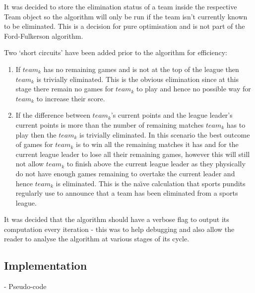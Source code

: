 It was decided to store the elimination status of a team inside the
respective Team object so the algorithm will only be run if the team isn't
currently known to be eliminated. This is a decision for pure optimisation and 
is not part of the Ford-Fulkerson algorithm.

Two `short circuits' have been added prior to the algorithm for efficiency:
\begin{enumerate}
\item If $team_k$ has no remaining games and is not at the top of the league
then $team_k$ is trivially eliminated. This is the obvious elimination since
at this stage there remain no games for $team_k$ to play and hence no possible
way for $team_k$ to increase their score.
\item If the difference between $team_k$'s current points and the league 
leader's current points is more than the number of remaining matches $team_k$ 
has to play then the $team_k$ is trivially eliminated. In this scenario the best 
outcome of games for $team_k$ is to win all the remaining matches it has and for 
the current league leader to lose all their remaining games, however this will
still not allow $team_k$ to finish above the current league leader as they
physically do not have enough games remaining to overtake the current leader and 
hence $team_k$ is eliminated. This is the na\"{\i}ve calculation that sports 
pundits regularly use to announce that a team has been eliminated from a sports 
league.
\end{enumerate}

It was decided that the algorithm should have a verbose flag to output
its computation every iteration - this was to help debugging and also
allow the reader to analyse the algorithm at various stages of its
cycle. 

\subsection{Implementation}

- Pseudo-code



